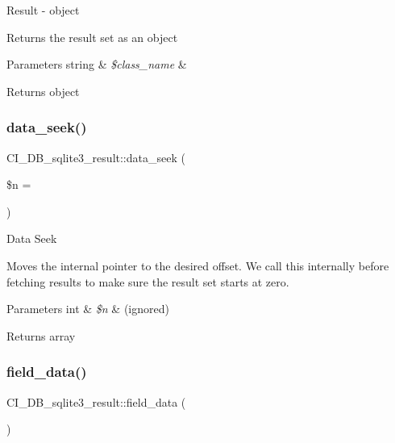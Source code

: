 Result -\/ object

Returns the result set as an object


\begin{DoxyParams}[1]{Parameters}
string & {\em \$class\+\_\+name} & \\
\hline
\end{DoxyParams}
\begin{DoxyReturn}{Returns}
object 
\end{DoxyReturn}
\mbox{\label{class_c_i___d_b__sqlite3__result_aa2f73ba8a0419edf298371afd94439fb}} 
\subsubsection{\texorpdfstring{data\+\_\+seek()}{data\_seek()}}
{\footnotesize\ttfamily C\+I\+\_\+\+D\+B\+\_\+sqlite3\+\_\+result\+::data\+\_\+seek (\begin{DoxyParamCaption}\item[{}]{\$n = {} }\end{DoxyParamCaption})}

Data Seek

Moves the internal pointer to the desired offset. We call this internally before fetching results to make sure the result set starts at zero.


\begin{DoxyParams}[1]{Parameters}
int & {\em \$n} & (ignored) \\
\hline
\end{DoxyParams}
\begin{DoxyReturn}{Returns}
array 
\end{DoxyReturn}
\mbox{\label{class_c_i___d_b__sqlite3__result_a0f8d669c6e719e475b3ff70972743528}} 
\subsubsection{\texorpdfstring{field\+\_\+data()}{field\_data()}}
{\footnotesize\ttfamily C\+I\+\_\+\+D\+B\+\_\+sqlite3\+\_\+result\+::field\+\_\+data (\begin{DoxyParamCaption}{ }\end{DoxyParamCaption})}

